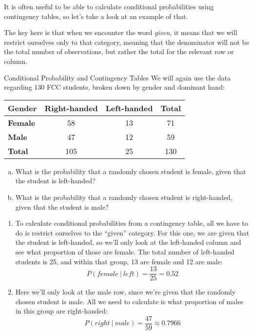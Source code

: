 It is often useful to be able to calculate conditional probabilities using contingency tables, so let's take a look at an example of that.

The key here is that when we encounter the word \emph{given}, it means that we will restrict ourselves only to that category, meaning that the denominator will not be the total number of observations, but rather the total for the relevant row or column.

\begin{example}[https://www.youtube.com/watch?v=0oCoc5B1lVU]{Conditional Probability and Contingency Tables}
We will again use the data regarding 130 FCC students, broken down by gender and dominant hand:
\begin{center}
\begin{tabular}{l | c c | c}
\textbf{Gender} & \textbf{Right-handed} & \textbf{Left-handed} & \textbf{Total} \\ \hline 
\textbf{Female} & 58 & 13 & 71\\
\textbf{Male} & 47 & 12 & 59  \\ \hline
\textbf{Total} & 105 & 25 & 130 \\ 
\end{tabular}
\end{center}
\begin{enumerate}[(a)]
\item What is the probability that a randomly chosen student is female, given that the student is left-handed?
\item What is the probability that a randomly chosen student is right-handed, given that the student is male?
\end{enumerate}

\sol
\begin{enumerate}
\item To calculate conditional probabilities from a contingency table, all we have to do is restrict ourselves to the ``given'' category.  For this one, we are given that the student is left-handed, so we'll only look at the left-handed column and see what proportion of those are female.  The total number of left-handed students is 25, and within that group, 13 are female and 12 are male:
\[P(female \ | \ left) = \boxed{\frac{13}{25} = 0.52}\]

\item Here we'll only look at the male row, since we're given that the randomly chosen student is male.  All we need to calculate is what proportion of males in this group are right-handed:
\[P(right \ | \ male) = \boxed{\frac{47}{59} \approx 0.7966}\]
\end{enumerate}
\end{example}

